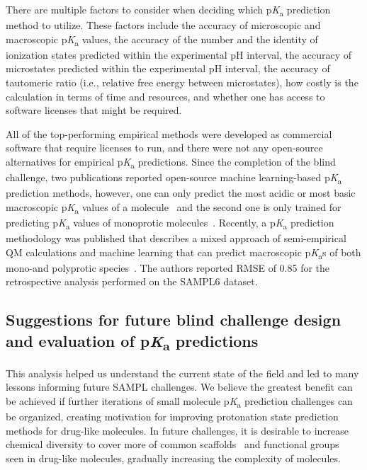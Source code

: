 \documentclass[9pt,lineno,final]{elife}
\newcommand{\pKa}{p\textit{K}\textsubscript{a}}
\begin{document}
There are multiple factors to consider when deciding which \pKa{} prediction method to utilize. 
These factors include the accuracy of microscopic and macroscopic \pKa{} values, the accuracy of the number and the identity of ionization states predicted within the experimental pH interval, the accuracy of microstates predicted within the experimental pH interval, the accuracy of tautomeric ratio (i.e., relative free energy between microstates), how costly is the calculation in terms of time and resources, and whether one has access to software licenses that might be required. 

All of the top-performing empirical methods were developed as commercial software that require licenses to run, and there were not any open-source alternatives for empirical \pKa{} predictions. 
Since the completion of the blind challenge, two publications reported open-source machine learning-based \pKa{} prediction methods, however, one can only predict the most acidic or most basic macroscopic \pKa{} values of a molecule~\citep{Mansouri:2019:J.Cheminformatics} and the second one is only trained for predicting \pKa{} values of monoprotic molecules~\citep{Baltruschat:2020:F1000Research}. 
Recently, a \pKa{} prediction methodology was published that describes a mixed approach of semi-empirical QM calculations and machine learning that can predict macroscopic \pKa{}s of both mono-and polyprotic species~\citep{Hunt:2020:J.Chem.Inf.Model.}. 
The authors reported RMSE of 0.85 for the retrospective analysis performed on the SAMPL6 dataset.



\subsection{Suggestions for future blind challenge design and evaluation of \pKa{} predictions}

This analysis helped us understand the current state of the field and led to many lessons informing future SAMPL challenges. 
We believe the greatest benefit can be achieved if further iterations of small molecule \pKa{} prediction challenges can be organized, creating motivation for improving protonation state prediction methods for drug-like molecules. 
In future challenges, it is desirable to increase chemical diversity to cover more of common scaffolds~\citep{Zdrazil:2018:J.Med.Chem.} and functional groups~\citep{Ertl:2020:J.Med.Chem.} seen in drug-like molecules, gradually increasing the complexity of molecules.
\end{document}
